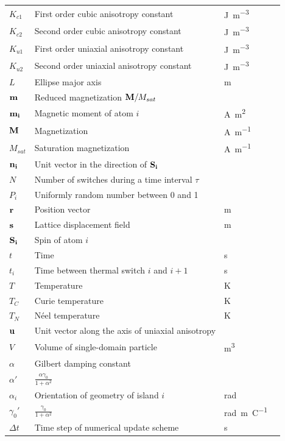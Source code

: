 \documentclass[11pt,a4paper,english]{article}
\begin{document}
\begin{longtable}{llll}
$K_{c1}$ & First order cubic anisotropy constant & \si{\joule\per\metre\cubed} \\
$K_{c2}$ & Second order cubic anisotropy constant & \si{\joule\per\metre\cubed} \\
$K_{u1}$ & First order uniaxial anisotropy constant & \si{\joule\per\metre\cubed} \\
$K_{u2}$ & Second order uniaxial anisotropy constant & \si{\joule\per\metre\cubed} \\
$L$ & Ellipse major axis & \si{\metre} \\
$\vb{m}$ & Reduced magnetization $\vb{M}/M_{sat}$ &  \\
$\vb{m_i}$ & Magnetic moment of atom $i$ & \si{\ampere\metre\squared} \\
$\vb{M}$ & Magnetization & \si{\ampere\per\metre} \\
$M_{sat}$ & Saturation magnetization & \si{\ampere\per\metre} \\
$\vb{n_i}$ & Unit vector in the direction of $\vb{S_i}$ &  \\
$N$ & Number of switches during a time interval $\tau$ &  \\
$P_i$ & Uniformly random number between 0 and 1 &  \\
$\vb{r}$ & Position vector & \si{\metre} \\
$\vb{s}$ & Lattice displacement field & \si{\metre} \\
$\vb{S_i}$ & Spin of atom $i$ &  \\
$t$ & Time & \si{\second} \\
$t_i$ & Time between thermal switch $i$ and $i+1$ & \si{\second} \\
$T$ & Temperature & \si{\kelvin} \\
$T_C$ & Curie temperature & \si{\kelvin} \\
$T_N$ & N\'{e}el temperature & \si{\kelvin} \\
$\vb{u}$ & Unit vector along the axis of uniaxial anisotropy &  \\
$V$ & Volume of single-domain particle & \si{\metre\cubed} \\
\midrule
$\alpha$ & Gilbert damping constant &  \\
$\alpha'$ & $\frac{\alpha \gamma_0}{1+\alpha^2}$ &  \\
$\alpha_i$ & Orientation of geometry of island $i$ & \si{\radian} \\
$\gamma_0'$ & $\frac{\gamma_0}{1+\alpha^2}$ & \si{\radian\metre\per\coulomb} \\
$\Delta t$ & Time step of numerical update scheme & \si{\second} \\

\end{longtable}
\end{document}

